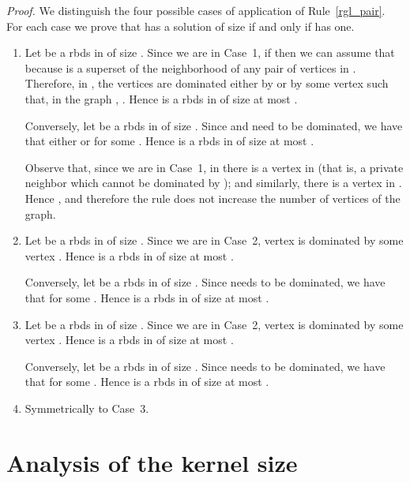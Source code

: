 \documentclass[a4paper,11pt]{article}
\newcommand{\rrgl}   [1] {Rule~\ref{#1}\xspace}
\newcommand{\drb}    [0] {rbds\xspace}
\newenvironment{proof}{\noindent \textit{Proof. }}{\hfill\vspace{.2cm}}
\begin{document}
\begin{proof}
We distinguish the four possible cases of application of \rrgl{rgl_pair}. For each case we prove that  has a solution of size  if and only if  has one.

\begin{enumerate}\itemsep0em
\item
Let  be a \drb in  of size .
Since we are in Case~1, if  then we can assume that  because  is a superset of the neighborhood of any pair of vertices in .
Therefore, in , the vertices  are dominated either by  or by some vertex  such that, in the graph ,  . Hence  is a \drb in  of size at most .

Conversely, let  be a \drb in  of size .
Since  and  need to be dominated, we have that either  or  for some . Hence  is a \drb in  of size at most .

Observe that, since we are in Case~1, in  there is a vertex in  (that is, a private neighbor which cannot be dominated by ); and similarly, there is a vertex in  . Hence , and therefore the rule does not increase the number of vertices of the graph.

\item
Let  be a \drb in  of size .
Since we are in Case~2, vertex  is dominated by some vertex .
Hence  is a \drb in  of size at most .

Conversely, let  be a \drb in  of size . Since  needs to be dominated, we have that  for some . Hence  is a \drb in  of size at most .

\item
Let  be a \drb in  of size .
Since we are in Case~2,  vertex  is dominated by some vertex .
Hence  is a \drb in  of size at most .

Conversely, let  be a \drb in  of size . Since  needs to be dominated, we have that  for some . Hence  is a \drb in  of size at most .

\item Symmetrically to Case~3.
\end{enumerate}\vspace{-.6cm}
\end{proof}


\section{Analysis of the kernel size} \label{sec:analysis}
\end{document}
